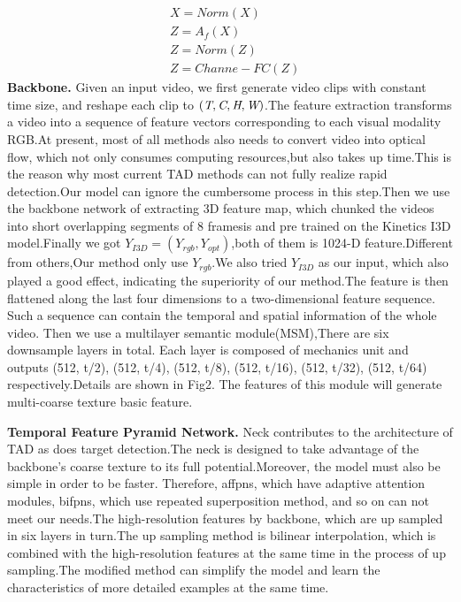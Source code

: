 \documentclass[10pt,twocolumn,letterpaper]{article}
\begin{document}
\begin{equation}
\begin{aligned}
    &X = Norm(X)\\
    &Z = A_f(X)\\
    &Z = Norm(Z)\\
    &Z = Channe-FC(Z)
\end{aligned}
\end{equation}
\textbf{Backbone.} Given an input video, we first generate video clips with constant time size, and reshape each clip to $(\emph{T},\emph{C},\emph{H},\emph{W})$.The feature extraction  transforms a video into a sequence of feature vectors corresponding to each visual modality RGB.At present, most of all methods also needs to convert video into optical flow, which not only consumes computing resources,but also takes up time.This is the reason why most current TAD methods can not fully realize rapid detection.Our model can ignore the cumbersome process in this step.Then we use the backbone network of extracting 3D feature map, which  chunked the videos into short overlapping segments of
8 framesis and pre trained on the Kinetics I3D model.Finally we got $Y_{I3D}=(Y_{rgb},Y_{opt})$,both of them is 1024-D feature.Different from others,Our method only use  $Y_{rgb}$.We also tried $Y_{I3D}$ as our input, which also played a good effect, indicating the superiority of our method.The feature is then flattened along the last four dimensions to a two-dimensional feature sequence. Such a sequence can contain the temporal and spatial information of the whole video. Then we use a multilayer semantic module(MSM),There are six downsample layers in total. Each layer is composed of mechanics unit and outputs (512, t/2), (512, t/4), (512, t/8), (512, t/16), (512, t/32), (512, t/64) respectively.Details are shown in Fig2. The features of this module will generate multi-coarse texture basic feature.

\textbf{Temporal Feature Pyramid Network.} 
Neck contributes to the architecture of TAD as does target detection.The neck is designed to take advantage of the backbone's coarse texture to its full potential.Moreover, the model must also be simple in order to be faster.
Therefore, affpns, which have adaptive attention modules, bifpns, which use repeated superposition method, and so on can not meet our needs.The high-resolution features by backbone, which are up sampled in six layers in turn.The up sampling method is bilinear interpolation, which is combined with the high-resolution features at the same time in the process of up sampling.The modified method can simplify the model and learn the characteristics of more detailed examples at the same time.
\end{document}
